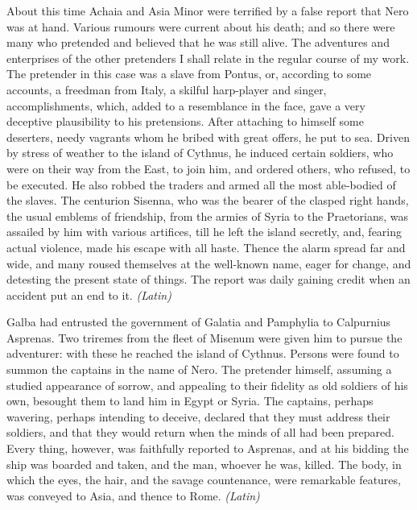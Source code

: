 
About this time Achaia and Asia Minor were terrified by a false report that Nero was at hand. Various rumours were current about his death; and so there were many who pretended and believed that he was still alive. The adventures and enterprises of the other pretenders I shall relate in the regular course of my work. The pretender in this case was a slave from Pontus, or, according to some accounts, a freedman from Italy, a skilful harp-player and singer, accomplishments, which, added to a resemblance in the face, gave a very deceptive plausibility to his pretensions. After attaching to himself some deserters, needy vagrants whom he bribed with great offers, he put to sea. Driven by stress of weather to the island of Cythnus, he induced certain soldiers, who were on their way from the East, to join him, and ordered others, who refused, to be executed. He also robbed the traders and armed all the most able-bodied of the slaves. The centurion Sisenna, who was the bearer of the clasped right hands, the usual emblems of friendship, from the armies of Syria to the Praetorians, was assailed by him with various artifices, till he left the island secretly, and, fearing actual violence, made his escape with all haste. Thence the alarm spread far and wide, and many roused themselves at the well-known name, eager for change, and detesting the present state of things. The report was daily gaining credit when an accident put an end to it. \emph{(Latin)}


Galba had entrusted the government of Galatia and Pamphylia to Calpurnius Asprenas. Two triremes from the fleet of Misenum were given him to pursue the adventurer: with these he reached the island of Cythnus. Persons were found to summon the captains in the name of Nero. The pretender himself, assuming a studied appearance of sorrow, and appealing to their fidelity as old soldiers of his own, besought them to land him in Egypt or Syria. The captains, perhaps wavering, perhaps intending to deceive, declared that they must address their soldiers, and that they would return when the minds of all had been prepared. Every thing, however, was faithfully reported to Asprenas, and at his bidding the ship was boarded and taken, and the man, whoever he was, killed. The body, in which the eyes, the hair, and the savage countenance, were remarkable features, was conveyed to Asia, and thence to Rome. \emph{(Latin)}


